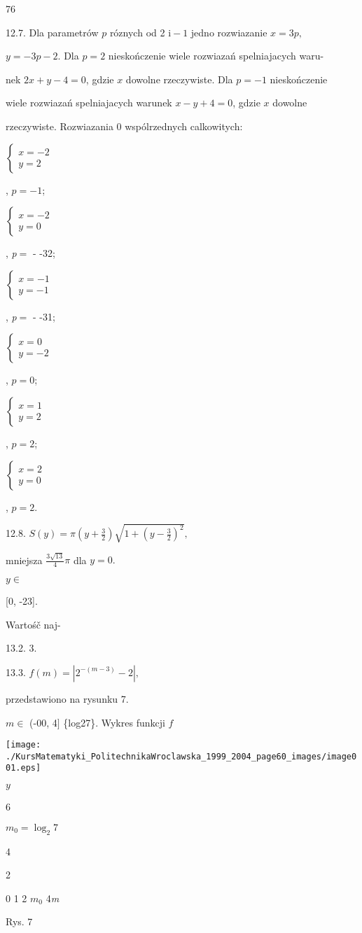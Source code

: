 \documentclass[a4paper,12pt]{article}
\begin{document}
76

12.7. Dla parametrów $p$ róznych od 2 $\mathrm{i}-1$ jedno rozwiazanie $x=3p,$

$y=-3p-2$. Dla $p=2$ nieskończenie wiele rozwiazań spelniajacych waru-

nek $2x+y-4=0$, gdzie $x$ dowolne rzeczywiste. Dla $p=-1$ nieskończenie

wiele rozwiazań spelniajacych warunek $x-y+4 = 0$, gdzie $x$ dowolne

rzeczywiste. Rozwiazania $0$ wspólrzednych calkowitych:

$\left\{\begin{array}{l}
x=-2\\
y=2
\end{array}\right.$

, $p=-1$;

$\left\{\begin{array}{l}
x=-2\\
y=0
\end{array}\right.$

, {\it p}$=$ - -32;

$\left\{\begin{array}{l}
x=-1\\
y=-1
\end{array}\right.$

, {\it p}$=$ - -31;

$\left\{\begin{array}{l}
x=0\\
y=-2
\end{array}\right.$

, $p=0$;

$\left\{\begin{array}{l}
x=1\\
y=2
\end{array}\right.$

, $p=2$;

$\left\{\begin{array}{l}
x=2\\
y=0
\end{array}\right.$

, $p=2.$

12.8. $S(y) = \displaystyle \pi(y+\frac{3}{2})\sqrt{1+(y-\frac{3}{2})^{2}},$

mniejsza $\displaystyle \frac{3\sqrt{13}}{4}\pi$ dla $y=0.$

$y \in$

[0, -23].

Wartośč naj-

13.2. 3.

13.3. $f(m)=|2^{-(m-3)}-2|,$

przedstawiono na rysunku 7.

$ m\in$ (-00, 4$]$ \{log27\}. Wykres funkcji $f$
\begin{center}
\texttt{[image: ./KursMatematyki\_PolitechnikaWroclawska\_1999\_2004\_page60\_images/image001.eps]}
\end{center}
$y$

6

$m_{0}=\log_{2}7$

4

2

0 1  2  $m_{0}$  4{\it m}

Rys. 7
\end{document}
